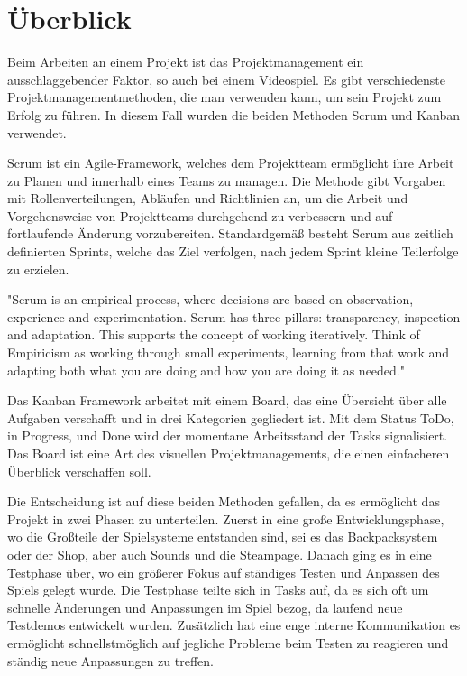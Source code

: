 
\section{Überblick}\label{sec:ueberblick}

\renewcommand{\kapitelautor}{Autor: Nils Hubmann} %

%
Beim Arbeiten an einem Projekt ist das Projektmanagement ein ausschlaggebender Faktor, so auch bei einem Videospiel. Es gibt verschiedenste Projektmanagementmethoden, die man verwenden kann, um sein Projekt zum Erfolg zu führen.
In diesem Fall wurden die beiden Methoden Scrum und Kanban verwendet.

Scrum ist ein Agile-Framework, welches dem Projektteam ermöglicht ihre Arbeit zu Planen und innerhalb eines Teams zu managen.
Die Methode gibt Vorgaben mit Rollenverteilungen, Abläufen und Richtlinien an, um die Arbeit und Vorgehensweise von Projektteams durchgehend zu verbessern und auf fortlaufende Änderung vorzubereiten.
Standardgemäß besteht Scrum aus zeitlich definierten Sprints, welche das Ziel verfolgen, nach jedem Sprint kleine Teilerfolge zu erzielen. 

"Scrum is an empirical process, where decisions are based on observation, experience and experimentation.
Scrum has three pillars: transparency, inspection and adaptation. This supports the concept of working iteratively.
Think of Empiricism as working through small experiments, learning from that work and adapting both what you are doing and how you are doing it as needed."

Das Kanban Framework arbeitet mit einem Board, das eine Übersicht über alle Aufgaben verschafft und in drei Kategorien gegliedert ist.
Mit dem Status ToDo, in Progress, und Done wird der momentane Arbeitsstand der Tasks signalisiert. Das Board ist eine Art des visuellen Projektmanagements, die einen einfacheren Überblick verschaffen soll.

Die Entscheidung ist auf diese beiden Methoden gefallen, da es ermöglicht das Projekt in zwei Phasen zu unterteilen.
Zuerst in eine große Entwicklungsphase, wo die Großteile der Spielsysteme entstanden sind, sei es das Backpacksystem oder der Shop, aber auch Sounds und die Steampage.
Danach ging es in eine Testphase über, wo ein größerer Fokus auf ständiges Testen und Anpassen des Spiels gelegt wurde.
Die Testphase teilte sich in Tasks auf, da es sich oft um schnelle Änderungen und Anpassungen im Spiel bezog, da laufend neue Testdemos entwickelt wurden.
Zusätzlich hat eine enge interne Kommunikation es ermöglicht schnellstmöglich auf jegliche Probleme beim Testen zu reagieren und ständig neue Anpassungen zu treffen.

%

\renewcommand{\kapitelautor}{}
